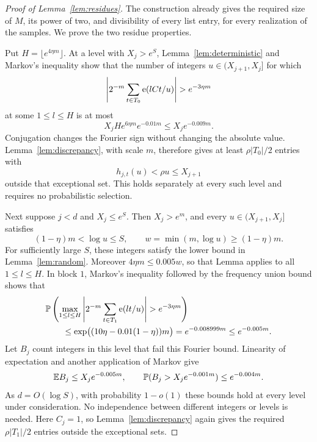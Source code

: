 \begin{proof}[Proof of Lemma~\ref{lem:residues}]
The construction already gives the required size of \(M\), its power of
two, and divisibility of every list entry, for every realization of the
samples.  We prove the two residue properties.

Put \(H=\lfloor e^{4\eta m}\rfloor\).
At a level with \(X_j>e^S\), Lemma~\ref{lem:deterministic} and Markov's
inequality show that the number of integers
\(u\in(X_{j+1},X_j]\) for which
\[
 \left|2^{-m}\sum_{t\in T_0}\e(lCt/u)\right|>e^{-3\eta m}
\]
at some \(1\le l\le H\) is at most
\[
 X_j H e^{6\eta m}e^{-0.01m}
 \le X_j e^{-0.009m}.
\]
Conjugation changes the Fourier sign without changing the absolute
value.  Lemma~\ref{lem:discrepancy}, with scale \(m\), therefore gives at
least \(\rho|T_0|/2\) entries with
\[
 h_{j,t}(u)<\rho u\le X_{j+1}
\]
outside that exceptional set.  This holds separately at every such
level and requires no probabilistic selection.

Next suppose \(j<d\) and \(X_j\le e^S\).  Then \(X_j>e^m\), and every
\(u\in(X_{j+1},X_j]\) satisfies
\[
 (1-\eta)m<\log u\le S,\qquad
 w=\min(m,\log u)\ge(1-\eta)m.
\]
For sufficiently large \(S\), these integers satisfy the lower bound
in Lemma~\ref{lem:random}.  Moreover
\(4\eta m\le0.005w\), so that Lemma applies to all \(1\le l\le H\).
In block \(1\), Markov's inequality followed by the frequency union
bound shows that
\begin{align*}
 &\Prob\left(
   \max_{1\le l\le H}
   \left|2^{-m}\sum_{t\in T_1}\e(lt/u)\right|>e^{-3\eta m}
 \right)\\
 &\hspace{2em}\le
 \exp\bigl((10\eta-0.01(1-\eta))m\bigr)
 =e^{-0.008999m}\le e^{-0.005m}.
\end{align*}
Let \(B_j\) count integers in this level that fail this Fourier bound.
Linearity of expectation and another application of Markov give
\[
 \mathbb E B_j\le X_j e^{-0.005m},
 \qquad
 \mathbb P(B_j>X_j e^{-0.001m})\le e^{-0.004m}.
\]
As \(d=O(\log S)\), with probability \(1-o(1)\) these bounds hold at
every level under consideration.  No independence between different
integers or levels is needed.  Here \(C_j=1\), so
Lemma~\ref{lem:discrepancy} again gives the required
\(\rho|T_1|/2\) entries outside the exceptional sets.


\end{proof}
